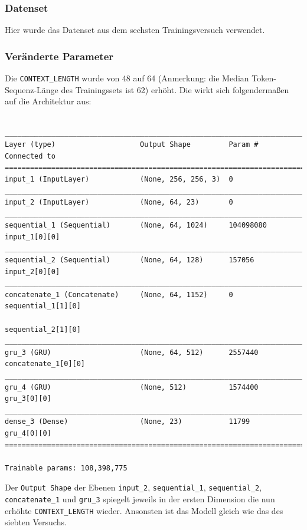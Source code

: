 \documentclass[pdftex,a4paper,halfparskip, article]{scrartcl}
\begin{document}
\subsubsection*{Datenset}

Hier wurde das Datenset aus dem sechsten Trainingsversuch verwendet.

\subsubsection*{Veränderte Parameter}

Die \texttt{CONTEXT\_LENGTH} wurde von 48 auf 64 (Anmerkung: die Median Token-Sequenz-Länge des Trainingssets ist 62) erhöht. Die wirkt sich folgendermaßen auf die Architektur aus:
\begin{verbatim}

_____________________________________________________________________________
Layer (type)                    Output Shape         Param #     Connected to
=============================================================================
input_1 (InputLayer)            (None, 256, 256, 3)  0
_____________________________________________________________________________
input_2 (InputLayer)            (None, 64, 23)       0
_____________________________________________________________________________
sequential_1 (Sequential)       (None, 64, 1024)     104098080   input_1[0][0]
_____________________________________________________________________________
sequential_2 (Sequential)       (None, 64, 128)      157056      input_2[0][0]
_____________________________________________________________________________
concatenate_1 (Concatenate)     (None, 64, 1152)     0           sequential_1[1][0]
                                                                 sequential_2[1][0]
_____________________________________________________________________________
gru_3 (GRU)                     (None, 64, 512)      2557440     concatenate_1[0][0]
_____________________________________________________________________________
gru_4 (GRU)                     (None, 512)          1574400     gru_3[0][0]
_____________________________________________________________________________
dense_3 (Dense)                 (None, 23)           11799       gru_4[0][0]
=============================================================================

Trainable params: 108,398,775

\end{verbatim}

Der \texttt{Output Shape} der Ebenen \texttt{input\_2},  \texttt{sequential\_1},  \texttt{sequential\_2},  \texttt{concatenate\_1} und \texttt{gru\_3} spiegelt jeweils in der ersten Dimension die nun erhöhte \texttt{CONTEXT\_LENGTH} wieder.
Ansonsten ist das Modell gleich wie das des siebten Versuchs.
\end{document}
